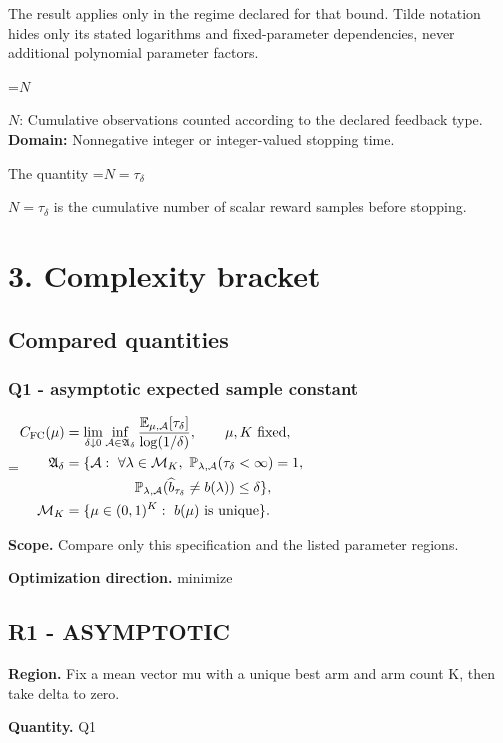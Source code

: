 \documentclass[10pt,a4paper]{article}
\newcommand{\AtlasMath}[1]{\par\begingroup\centering\setbox0=\hbox{$\displaystyle #1$}\ifdim\wd0>1.4\linewidth\typeout{ATLAS WIDE FORMULA: \the\wd0}\fi\ifdim\wd0>\linewidth\resizebox{\linewidth}{!}{\box0}\else\box0\fi\par\endgroup}
\newcommand{\AtlasInlineMath}[1]{\begingroup\setbox0=\hbox{$#1$}\ifdim\wd0>.4\linewidth\endgroup\AtlasMath{#1}\else\endgroup$#1$\fi}
\begin{document}
The result applies only in the regime declared for that bound. Tilde notation hides only its stated logarithms and fixed-parameter dependencies, never additional polynomial parameter factors.

\AtlasInlineMath{N}: Cumulative observations counted according to the declared feedback type. \textbf{Domain:} Nonnegative integer or integer-valued stopping time.

The quantity \AtlasInlineMath{N=\tau_\delta} is the cumulative number of scalar reward samples before stopping.

\section{3. Complexity bracket}
\subsection{Compared quantities}
\subsubsection{Q1 - asymptotic expected sample constant}
\AtlasMath{\begin{aligned} C_{\rm FC}(\mu)&=\lim_{\delta\downarrow0}\inf_{\mathcal A\in\mathfrak A_\delta}\frac{\mathbb E_{\mu,\mathcal A}[\tau_\delta]}{\log(1/\delta)},\qquad \mu,K\ \text{fixed},\\ \mathfrak A_\delta&=\{\mathcal A:\ \forall\lambda\in\mathcal M_K,\ \mathbb P_{\lambda,\mathcal A}(\tau_\delta<\infty)=1,\\ &\hspace{5em}\mathbb P_{\lambda,\mathcal A}(\widehat b_{\tau_\delta}\ne b(\lambda))\le\delta\},\\ \mathcal M_K&=\{\mu\in(0,1)^K:\ b(\mu)\text{ is unique}\}.\end{aligned}}
\textbf{Scope.} Compare only this specification and the listed parameter regions.

\textbf{Optimization direction.} minimize

\subsection{R1 - ASYMPTOTIC}
\textbf{Region.} Fix a mean vector mu with a unique best arm and arm count K, then take delta to zero.

\textbf{Quantity.} Q1
\end{document}

